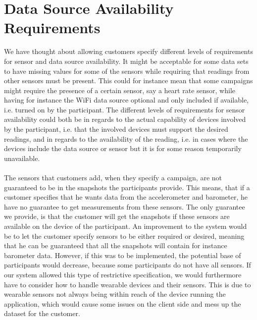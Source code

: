 
\section{Data Source Availability Requirements}

We have thought about allowing customers specify different levels of requirements for sensor and data source availability. It might be acceptable for some data sets to have missing values for some of the sensors while requiring that readings from other sensors must be present. This could for instance mean that some campaigns might require the presence of a certain sensor, say a heart rate sensor, while having for instance the WiFi data source optional and only included if available, i.e. turned on by the participant. The different levels of requirements for sensor availability could both be in regards to the actual capability of devices involved by the participant, i.e. that the involved devices must support the desired readings, and in regards to the availability of the reading, i.e. in cases where the devices include the data source or sensor but it is for some reason temporarily unavailable.
\\\\
The sensors that customers add, when they specify a campaign, are not guaranteed to be in the snapshots the participants provide. This means, that if a customer specifies that he wants data from the accelerometer and barometer, he have no guarantee to get measurements from these sensors. The only guarantee we provide, is that the customer will get the snapshots if these sensors are available on the device of the participant. An improvement to the system would be to let the customer specify sensors to be either required or desired, meaning that he can be guaranteed that all the snapshots will contain for instance barometer data. However, if this was to be implemented, the potential base of participants would decrease, because some participants do not have all sensors. If our system allowed this type of restrictive specification, we would furthermore have to consider how to handle wearable devices and their sensors. This is due to wearable sensors not always being within reach of the device running the application, which would cause some issues on the client side and mess up the dataset for the customer.   


